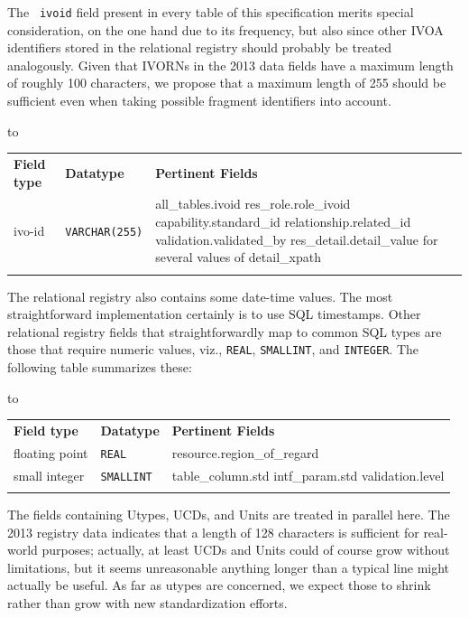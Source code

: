 \documentclass[11pt,a4paper]{ivoa}
\newcommand{\rtent}[1]{\texttt{\color{rtcolor} #1}}
\newcommand{\sptablerule}{\noalign{\vspace{2pt}}\hline\noalign{\vspace{2pt}}}
\newenvironment{inlinetable}{\vfil\penalty8000\vfilneg%
    \hbox to\hsize\bgroup\hss}
  {\hss\egroup\vspace{8pt}}
\begin{document}
The \rtent{ivoid} field present in every table of this
specification merits special consideration, on the one hand due to its
frequency, but also since other IVOA identifiers stored in the
relational registry should probably be treated analogously.
Given that IVORNs in the 2013 data fields have a maximum
length of roughly 100 characters, we propose that a maximum length of 
255 should be sufficient even when taking possible fragment identifiers
into account.

\begin{inlinetable}
\begin{tabular}{llp{6cm}}
\sptablerule
\textbf{Field type}&
\textbf{Datatype}&
\textbf{Pertinent Fields}\\
\sptablerule
ivo-id&\texttt{VARCHAR(255)}&
          {all\_tables}.ivoid\hfil\break
          res\_role.role\_ivoid\hfil\break
          capability.standard\_id\hfil\break
          relationship.related\_id\hfil\break
          validation.validated\_by\hfil\break
          res\_detail.detail\_value for several values of detail\_xpath\\
\sptablerule
\end{tabular}
\end{inlinetable}

The relational registry also contains some date-time values. The most
straightforward implementation certainly is to use SQL timestamps.
Other relational registry fields that straightforwardly map to common
SQL types are those that require numeric values, viz.,
\texttt{REAL}, \texttt{SMALLINT}, and
\texttt{INTEGER}.  The following table summarizes these:


\begin{inlinetable}
\begin{tabular}{llp{6cm}}
\sptablerule
\textbf{Field type}&
\textbf{Datatype}&
\textbf{Pertinent Fields}\\
\sptablerule
floating point&\texttt{REAL}&resource.region\_of\_regard\\
\sptablerule
small integer&\texttt{SMALLINT}&table\_column.std\hfil\break
          intf\_param.std\hfil\break
          validation.level\\
\sptablerule
\end{tabular}
\end{inlinetable}

The fields containing Utypes, UCDs, and Units are treated in parallel
here. The 2013 registry data indicates that a length of 128 characters is
sufficient for real-world purposes; actually, at least UCDs and Units
could of course grow without limitations, but it seems unreasonable
anything longer than a typical line might actually be useful.  As far as
utypes are concerned, we expect those to shrink rather than grow with
new standardization efforts.
\end{document}
